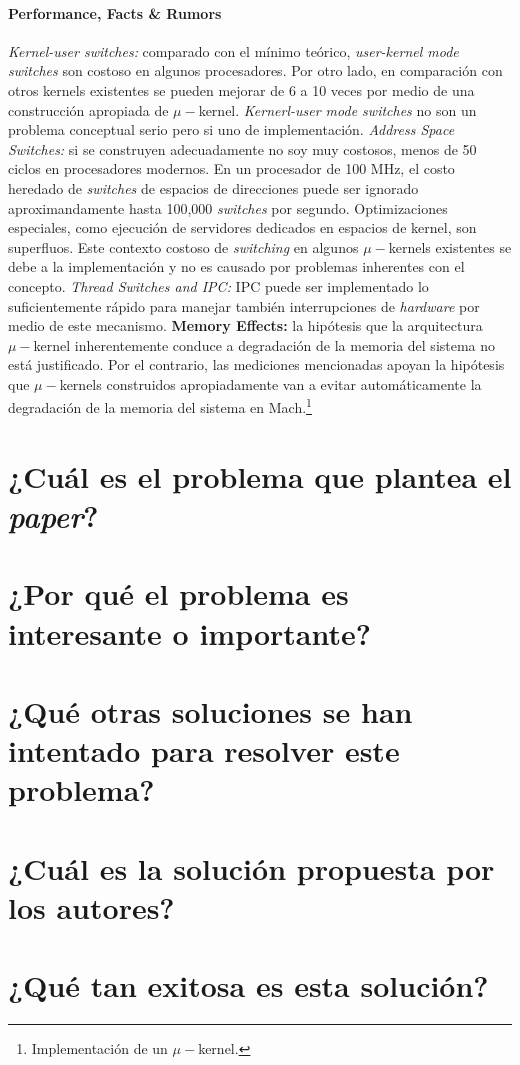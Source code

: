 \paragraph{\textnormal{\textbf{Performance, Facts \& Rumors}}}
\textit{Kernel-user switches:} comparado con el mínimo teórico, \textit{user-kernel mode switches} son costoso en algunos procesadores. Por otro lado, en comparación con otros kernels existentes se pueden mejorar de 6 a 10 veces por medio de una construcción apropiada de $\mu-$kernel. \textit{Kernerl-user mode switches} no son un problema conceptual serio pero si uno de implementación. \textit{Address Space Switches:} si se construyen adecuadamente no soy muy costosos, menos de 50 ciclos en procesadores modernos. En un procesador de 100 MHz, el costo heredado de \textit{switches} de espacios de direcciones puede ser ignorado aproximandamente hasta 100,000 \textit{switches} por segundo. Optimizaciones especiales, como ejecución de servidores dedicados en espacios de kernel, son superfluos. Este contexto costoso de \textit{switching} en algunos $\mu-$kernels existentes se debe a la implementación y no es causado por problemas inherentes con el concepto. \textit{Thread Switches and IPC:} IPC puede ser implementado lo suficientemente rápido para manejar también interrupciones de \textit{hardware} por medio de este mecanismo. \textbf{Memory Effects:} la hipótesis que la arquitectura $\mu-$kernel inherentemente conduce a degradación de la memoria del sistema no está justificado. Por el contrario, las mediciones mencionadas apoyan la hipótesis que $\mu-$kernels construidos apropiadamente van a evitar automáticamente la degradación de la memoria del sistema en Mach.\footnote{Implementación de un $\mu-$kernel.}




\section{¿Cuál es el problema que plantea el \textit{paper}?}

\section{¿Por qué el problema es interesante o importante?}

\section{¿Qué otras soluciones se han intentado para resolver este problema?}
     
\section{¿Cuál es la solución propuesta por los autores?}

\section{¿Qué tan exitosa es esta solución?} 